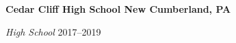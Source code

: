 \textbf{Cedar Cliff High School \hfill New Cumberland, PA} \par
\textit{High School} \hfill 2017--2019\par